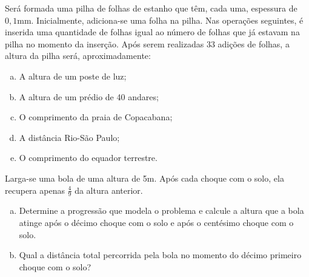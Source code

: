 \begin{exercise}
Será formada uma pilha de folhas de estanho que têm, cada uma,
espessura de $0,1$mm. Inicialmente, adiciona-se uma folha na pilha.
Nas operações seguintes, é inserida uma quantidade de folhas igual
ao número de folhas que já estavam na pilha no momento da inserção.
Após serem realizadas 33 adições de folhas, a altura da pilha será,
aproximadamente:
\begin{enumerate}[a.]
  \item A altura de um poste de luz;
  \item A altura de um prédio de 40 andares;
  \item O comprimento da praia de Copacabana;
  \item A distância Rio-São Paulo;
  \item O comprimento do equador terrestre.
\end{enumerate}
\end{exercise}

\begin{exercise}
    Larga-se uma bola de uma altura de 5m. Após cada choque com o
solo, ela recupera apenas $\frac 4 9 $ da altura anterior. 
%
\begin{enumerate}[a.]
    \item Determine a progressão que modela o problema e calcule 
    a altura que a bola atinge após o décimo choque com o solo
    e após o centésimo choque com o solo.
    \item Qual a distância total percorrida pela bola no momento 
    do décimo primeiro choque com o solo? 
\end{enumerate}
\end{exercise}




